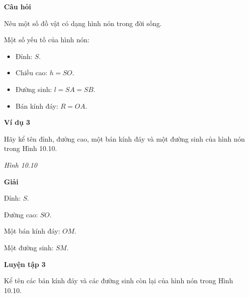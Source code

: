     \textbf{Câu hỏi}

    Nêu một số đồ vật có dạng hình nón trong đời sống.

    \answerline

    \begin{keyconcept}
        Một số yếu tố của hình nón:
        \begin{itemize}
            \item Đỉnh: $S$.
            \item Chiều cao: $h=SO$.
            \item Đường sinh: $l=SA=SB$.
            \item Bán kính đáy: $R=OA$.
        \end{itemize}
    \end{keyconcept}

    \textbf{Ví dụ 3}

    Hãy kể tên đỉnh, đường cao, một bán kính đáy và một đường sinh của hình nón trong Hình 10.10.

    \begin{center}

        \textit{Hình 10.10}
    \end{center}

    \textbf{Giải}

    Đỉnh: $S$.

    Đường cao: $SO$.

    Một bán kính đáy: $OM$.

    Một đường sinh: $SM$.

    \textbf{Luyện tập 3}

    Kể tên các bán kính đáy và các đường sinh còn lại của hình nón trong Hình 10.10.

